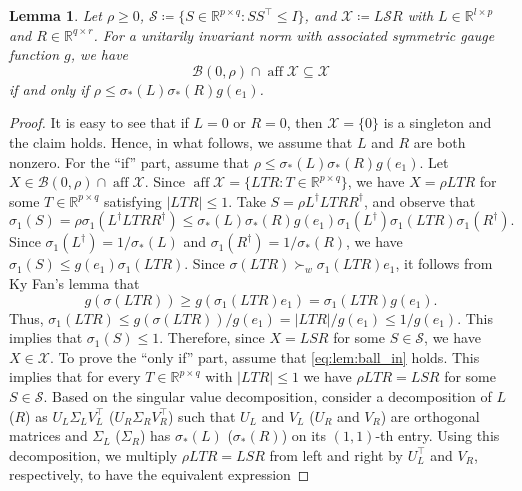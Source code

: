 \documentclass[pdflatex,sn-mathphys-num]{sn-jnl}%
\DeclareMathOperator{\aff}{aff}
\newcommand{\norm}[1]{\left|#1\right|}
\theoremstyle{thmstyleone}
\newtheorem{lemma}[theorem]{Lemma}
\begin{document}
\begin{lemma}
\label{lem:ball_in}
Let $\rho\geq 0$, $\mathcal{S}\coloneqq \{S\in\mathbb{R}^{p\times q}:SS^\top\leq I\}$, and $\mathcal{X}\coloneqq L\mathcal{S}R$ with $L\in\mathbb{R}^{l\times p}$ and $R\in\mathbb{R}^{q\times r}$. For a unitarily invariant norm with associated symmetric gauge function $g$, we have
\begin{equation}
\label{eq:lem:ball_in}
\mathcal{B}(0,\rho)\cap\aff\mathcal{X}\subseteq\mathcal{X} 
\end{equation}
if and only if $\rho\leq \sigma_*(L)\sigma_*(R)g(e_{1})$. 
\end{lemma}
\begin{proof}
It is easy to see that if $L=0$ or $R=0$, then $\mathcal{X}=\{0\}$ is a singleton and the claim holds. Hence, in what follows, we assume that $L$ and $R$ are both nonzero. For the ``if'' part, assume that $\rho\leq\sigma_*(L)\sigma_*(R)g(e_1)$. Let $X\in\mathcal{B}(0,\rho)\cap\aff\mathcal{X}$. Since $\aff \mathcal{X}=\{LTR:T\in\mathbb{R}^{p\times q}\}$, we have $X=\rho LTR$ for some $T\in\mathbb{R}^{p\times q}$ satisfying $\norm{LTR}\leq 1$. Take $S=\rho L^{\dagger}LTRR^{\dagger}$, and observe that 
\begin{equation}
\sigma_1(S)=\rho\sigma_1(L^{\dagger}LTRR^{\dagger})\leq \sigma_*(L)\sigma_*(R)g(e_1) \sigma_1(L^{\dagger})\sigma_1(LTR)\sigma_1(R^{\dagger}).
\end{equation}
Since $\sigma_1(L^\dagger)=1/\sigma_*(L)$ and $\sigma_1(R^\dagger)=1/\sigma_*(R)$, we have $\sigma_1(S)\leq g(e_1) \sigma_1(LTR)$. Since $\sigma(LTR)\succ_w\sigma_1(LTR)e_1$, it follows from Ky Fan's lemma \cite[Prop. 4.B.6]{marshall2011inequalities} that
\begin{equation}
g(\sigma(LTR))\geq g(\sigma_1(LTR)e_1)=\sigma_1(LTR)g(e_1).
\end{equation}
Thus, $\sigma_1(LTR)\leq g(\sigma(LTR))/g(e_1)=\norm{LTR}/g(e_1) \leq 1/g(e_1)$. This implies that \mbox{$\sigma_1(S)\leq 1$}. Therefore, since $X=LSR$ for some $S\in\mathcal{S}$, we have $X\in\mathcal{X}$. To prove the ``only if'' part, assume that \eqref{eq:lem:ball_in} holds. This implies that for every $T\in\mathbb{R}^{p\times q}$ with $\norm{LTR}\leq 1$ we have $\rho LTR=LSR$ for some $S\in\mathcal{S}$. Based on the singular value decomposition, consider a decomposition of $L$ ($R$) as $U_L\Sigma_LV_L^\top$ ($U_R\Sigma_RV_R^\top$) such that $U_L$ and $V_L$ ($U_R$ and $V_R$) are orthogonal matrices and $\Sigma_L$ ($\Sigma_R$) has $\sigma_*(L)$ ($\sigma_*(R)$) on its $(1,1)$-th entry. Using this decomposition, we multiply $\rho LTR=LSR$ from left and right by $U_L^\top$ and $V_R$, respectively, to have the equivalent expression

\end{proof}
\end{document}

